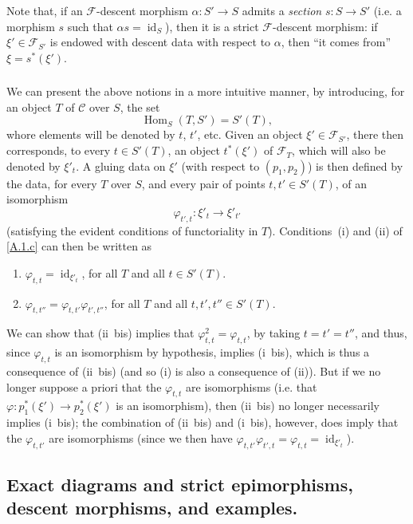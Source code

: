 \documentclass{article}
\theoremstyle{plain}
\theoremstyle{definition}
\newcommand{\sh}[1]{{\mathscr{#1}}}
\newcommand{\cat}[1]{{\mathcal{#1}}}
\DeclareMathOperator{\id}{id}
\DeclareMathOperator{\Hom}{Hom}
\newcommand{\oldpage}[1]{\marginpar{\footnotesize$\Big\vert$ \textit{p.~#1}}}
\begin{document}
Note that, if an $\sh{F}$-descent morphism $\alpha\colon S'\to S$ admits a \emph{section} $s\colon S\to S'$ (i.e. a morphism $s$ such that $\alpha s=\id_S$), then it is a strict $\sh{F}$-descent morphism:
if $\xi'\in\sh{F}_{S'}$ is endowed with descent data with respect to $\alpha$, then ``it comes from'' $\xi=s^*(\xi')$.


\subsubsection{}
\label{A.1.d}
We can present the above notions in a more intuitive manner, by introducing, for an object $T$ of $\cat{C}$ over $S$, the set
\[
  \Hom_S(T,S') = S'(T),
\]
whore elements will be denoted by $t$, $t'$, etc.
Given an object $\xi'\in\sh{F}_{S'}$, there then corresponds, to every $t\in S'(T)$, an object $t^*(\xi')$ of $\sh{F}_T$, which will also be denoted by $\xi'_t$.
A gluing data on $\xi'$ (with respect to $(p_1,p_2)$) is then defined by the data, for every $T$ over $S$, and every pair of points $t,t'\in S'(T)$, of an isomorphism
\[
  \varphi_{t',t}\colon \xi'_t \to \xi'_{t'}
\]
(satisfying the evident conditions of functoriality in $T$).
Conditions~(i) and (ii) of \cref{A.1.c} can then be written as
\begin{enumerate}[(i {bis})]
  \item $\varphi_{t,t}=\id_{\xi'_t}$, for all $T$ and all $t\in S'(T)$.
\oldpage{190-06}
  \item $\varphi_{t,t''}=\varphi_{t,t'}\varphi_{t',t''}$, for all $T$ and all $t,t',t''\in S'(T)$.
\end{enumerate}

We can show that (ii~bis) implies that $\varphi_{t,t}^2=\varphi_{t,t}$, by taking $t=t'=t''$, and thus, since $\varphi_{t,t}$ is an isomorphism by hypothesis, implies (i~bis), which is thus a consequence of (ii~bis) (and so (i) is also a consequence of (ii)).
But if we no longer suppose a priori that the $\varphi_{t,t}$ are isomorphisms (i.e. that $\varphi\colon p_1^*(\xi')\to p_2^*(\xi')$ is an isomorphism), then (ii~bis) no longer necessarily implies (i~bis);
the combination of (ii~bis) and (i~bis), however, does imply that the $\varphi_{t,t'}$ are isomorphisms (since we then have $\varphi_{t,t'}\varphi_{t',t}=\varphi_{t,t}=\id_{\xi'_t}$).


\subsection{Exact diagrams and strict epimorphisms, descent morphisms, and examples.}
\label{A.2}
\end{document}
